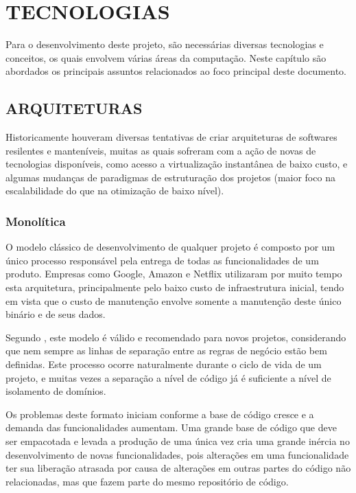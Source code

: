 \chapter{TECNOLOGIAS}

Para o desenvolvimento deste projeto, são necessárias diversas tecnologias e
conceitos, os quais envolvem várias áreas da computação. Neste capítulo são
abordados os principais assuntos relacionados ao foco principal deste documento.

\section{ARQUITETURAS}

Historicamente houveram diversas tentativas de criar arquiteturas de softwares
resilentes e manteníveis, muitas as quais sofreram com a ação de novas de
tecnologias disponíveis, como acesso a virtualização instantânea de baixo custo,
e algumas mudanças de paradigmas de estruturação dos projetos (maior foco na
escalabilidade do que na otimização de baixo nível).

\subsection{Monolítica}

O modelo clássico de desenvolvimento de qualquer projeto é composto por um
único processo responsável pela entrega de todas as funcionalidades de um
produto. Empresas como Google, Amazon e Netflix utilizaram por muito tempo
esta arquitetura, principalmente pelo baixo custo de infraestrutura inicial,
tendo em vista que o custo de manutenção envolve somente a manutenção deste
único binário e de seus dados.

Segundo , este modelo é válido e recomendado para novos
projetos, considerando que nem sempre as linhas de separação entre as regras
de negócio estão bem definidas. Este processo ocorre naturalmente durante o
ciclo de vida de um projeto, e muitas vezes a separação a nível de código já
é suficiente a nível de isolamento de domínios.

Os problemas deste formato iniciam conforme a base de código cresce e a demanda
das funcionalidades aumentam. Uma grande base de código que deve ser empacotada
e levada a produção de uma única vez cria uma grande inércia no desenvolvimento
de novas funcionalidades, pois alterações em uma funcionalidade ter sua
liberação atrasada por causa de alterações em outras partes do código não
relacionadas, mas que fazem parte do mesmo repositório de código.

